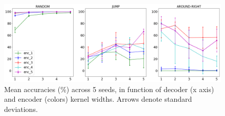 \begin{figure}[tb]
    \centering
    \includegraphics[width=\textwidth,keepaspectratio]{figures/kernel_exp.png}
    \caption{Mean accuracies (\%) across 5 seeds, in function of decoder (x axis) and encoder (colors) kernel widths. Arrows denote standard deviations.
    }
    \label{fig:kernel_exp}
\end{figure}

